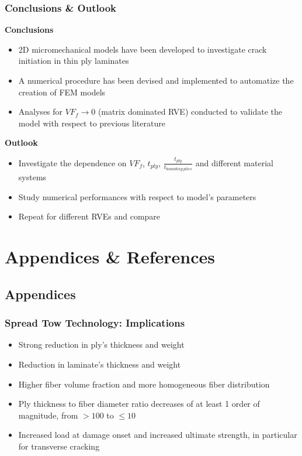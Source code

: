 \documentclass[first,firstsupp,lastsupp,handout,last,hyperref,table]{ETHclass}
\begin{document}
\begin{frame}
\frametitle{\vspace*{0.5cm} Conclusions \& Outlook}
\vspace{-0.75cm}
\centering
\scriptsize
\begin{alertblock}{\footnotesize \bf{Conclusions}}
\begin{itemize}
   	\item 2D micromechanical models have been developed to investigate crack initiation in thin ply laminates
	\item A numerical procedure has been devised and implemented to automatize the creation of FEM models
	\item Analyses for $VF_{f}\to 0$ (matrix dominated RVE) conducted to validate the model with respect to previous literature
\end{itemize}
\end{alertblock}
\begin{alertblock}{\footnotesize \bf{Outlook}}
\begin{itemize}
	\item Investigate the dependence on $VF_{f}$, $t_{ply}$, $\frac{t_{ply}}{t_{bounding\ plies}}$ and different material systems\\[9pt]
	\item Study numerical performances with respect to model's parameters\\[9pt]
	\item Repeat for different RVEs and compare
\end{itemize}
\end{alertblock}
\end{frame}

\section{Appendices \& References}

\subsection{Appendices}


\begin{frame}
\frametitle{Spread Tow Technology: Implications}
\vspace{-0.75cm}
\centering
\begin{itemize}
	\item Strong reduction in ply's thickness and weight
	\item Reduction in laminate's thickness and weight
	\item Higher fiber volume fraction and more homogeneous fiber distribution
	\item Ply thickness to fiber diameter ratio decreases of at least 1 order of magnitude, from $>100$ to $\leq10$
	\item Increased load at damage onset and increased ultimate strength, in particular for transverse cracking
\end{itemize}
\end{frame}
\end{document}
